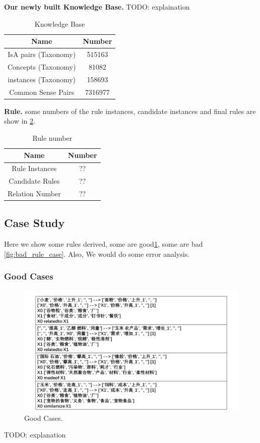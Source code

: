 \textbf{Our newly built Knowledge Base.}
TODO: explaination
\begin{table}[t]
	\caption{Knowledge Base}
	\begin{center}
		\begin{tabular}{|c|c|}
			\hline
			\textbf{Name}&\textbf{Number}\\
			\hline
			IsA pairs (Taxonomy)&515163\\
			\hline
			Concepts (Taxonomy)&81082\\
			\hline
			instances (Taxonomy)&158693\\
			\hline
			Common Sense Pairs&7316977\\
			\hline
		\end{tabular}
		\label{tab3}
	\end{center}
\end{table}	

\textbf{Rule.}
some numbers of the rule instances, candidate instances and final rules are show in \ref{tab3}.
\begin{table}[t]
	\caption{Rule number}
	\begin{center}
		\begin{tabular}{|c|c|}
			\hline
			\textbf{Name}&\textbf{Number}\\
			\hline
			Rule Instances&??\\
			\hline
			Candidate Rules&??\\
			\hline
			Relation Number&??\\
			\hline
		\end{tabular}
		\label{tab3}
	\end{center}
\end{table}	

\subsection{Case Study}

Here we show some rules derived, some are good\ref{fig:good_rule_case}, some are bad \ref{fig:bad_rule_case}. Also, We would do some error analysis.
\subsubsection{Good Cases}
\begin{figure}[htbp]
	\centerline{\includegraphics[width=0.9\columnwidth]{figures/good_rule_case}}
	\caption{Good Cases.}
	\label{fig:good_rule_case}
\end{figure}	
	TODO: explanation   
	
